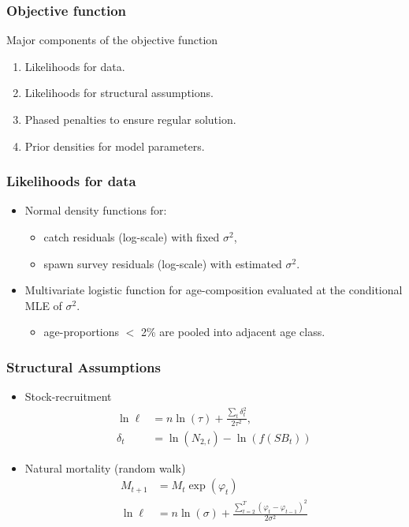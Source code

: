 \begin{frame}[c]\frametitle{Objective function}
	
		Major components of the objective function
		\begin{enumerate}
			\item Likelihoods for data.
			\item Likelihoods for structural assumptions.
			\item Phased penalties to ensure regular solution.
			\item Prior densities for model parameters.
		\end{enumerate}
\end{frame}
%
\begin{frame}[c]\frametitle{Likelihoods for data}

		\begin{itemize}
			\item<+-> Normal density functions for:
			\begin{itemize}
				\item catch residuals (log-scale) with fixed $\sigma^2$,
				\item spawn survey residuals (log-scale) with estimated $\sigma^2$. 
			\end{itemize}
			\vfill
			\item<+-> Multivariate logistic function for age-composition evaluated at the conditional MLE of $\sigma^2$.
			\begin{itemize}
				\item age-proportions $<$ 2\% are pooled into adjacent age class. 
			\end{itemize}
		\end{itemize}
\end{frame}
%
\begin{frame}[c]\frametitle{Structural Assumptions}
		\begin{itemize}
			\item<+-> Stock-recruitment \\ 
			\begin{align}
				\ln\ell &= n\ln(\tau) + \frac{\sum_t \delta_t^2}{2\tau^2},\nonumber\\
				\delta_t &= \ln(N_{2,t}) - \ln(f(SB_t))\nonumber
			\end{align}
			\item<+-> Natural mortality (random walk)\\
			\begin{align}
				M_{t+1} &= M_t \exp(\varphi_t) \nonumber \\
				\ln\ell &= n\ln(\sigma) + \frac{\sum_{t=2}^T (\varphi_t-\varphi_{t-1})^2}{2\sigma^2}\nonumber
			\end{align}
		\end{itemize}
\end{frame}
